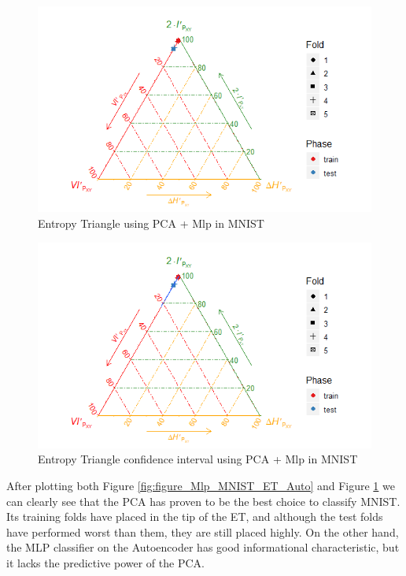 \begin{figure}[H]
	\centering
	\includegraphics[width=1\linewidth]{Figuras_tfg/MNIST_PCA_mlp}
	\caption{Entropy Triangle using PCA + Mlp in MNIST}
	\label{fig:figure_Mlp_MNIST_ET_PCA}
\end{figure}

\begin{figure}[H]
	\centering
	\includegraphics[width=1\linewidth]{Figuras_tfg/MNIST_PCA_mlp_Confidence}
	\caption{Entropy Triangle confidence interval using PCA + Mlp in MNIST}
	\label{fig:figure_Mlp_MNIST_ET_PCA_Confidence}
\end{figure}

After plotting both Figure \ref{fig:figure_Mlp_MNIST_ET_Auto} and Figure \ref{fig:figure_Mlp_MNIST_ET_PCA} we can clearly see that the PCA has proven to be the best choice to classify MNIST. Its training folds have placed in the tip of the ET, and although the test folds have performed worst than them, they are still placed highly. On the other hand, the MLP classifier on the Autoencoder has good informational characteristic, but it lacks the predictive power of the PCA.\par

